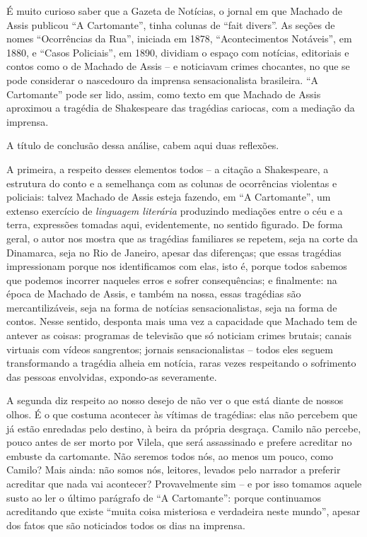 \documentclass{extarticle}
\begin{document}
É muito curioso saber que a Gazeta de Notícias, o jornal em que Machado
de Assis publicou ``A Cartomante'', tinha colunas de ``fait divers''. As
seções de nomes ``Ocorrências da Rua'', iniciada em 1878,
``Acontecimentos Notáveis'', em 1880, e ``Casos Policiais'', em 1890,
dividiam o espaço com notícias, editoriais e contos como o de Machado de
Assis -- e noticiavam crimes chocantes, no que se pode considerar o
nascedouro da imprensa sensacionalista brasileira. ``A Cartomante'' pode
ser lido, assim, como texto em que Machado de Assis aproximou a tragédia
de Shakespeare das tragédias cariocas, com a mediação da imprensa.

A título de conclusão dessa análise, cabem aqui duas reflexões.

A primeira, a respeito desses elementos todos -- a citação a
Shakespeare, a estrutura do conto e a semelhança com as colunas de
ocorrências violentas e policiais: talvez Machado de Assis esteja
fazendo, em ``A Cartomante'', um extenso exercício de \emph{linguagem
literária} produzindo mediações entre o céu e a terra, expressões
tomadas aqui, evidentemente, no sentido figurado. De forma geral, o
autor nos mostra que as tragédias familiares se repetem, seja na corte
da Dinamarca, seja no Rio de Janeiro, apesar das diferenças; que essas
tragédias impressionam porque nos identificamos com elas, isto é, porque
todos sabemos que podemos incorrer naqueles erros e sofrer
consequências; e finalmente: na época de Machado de Assis, e também na
nossa, essas tragédias são mercantilizáveis, seja na forma de notícias
sensacionalistas, seja na forma de contos. Nesse sentido, desponta mais
uma vez a capacidade que Machado tem de antever as coisas: programas de
televisão que só noticiam crimes brutais; canais virtuais com vídeos
sangrentos; jornais sensacionalistas -- todos eles seguem transformando
a tragédia alheia em notícia, raras vezes respeitando o sofrimento das
pessoas envolvidas, expondo-as severamente.

A segunda diz respeito ao nosso desejo de não ver o que está diante de
nossos olhos. É o que costuma acontecer às vítimas de tragédias: elas
não percebem que já estão enredadas pelo destino, à beira da própria
desgraça. Camilo não percebe, pouco antes de ser morto por Vilela, que
será assassinado e prefere acreditar no embuste da cartomante. Não
seremos todos nós, ao menos um pouco, como Camilo? Mais ainda: não somos
nós, leitores, levados pelo narrador a preferir acreditar que nada vai
acontecer? Provavelmente sim -- e por isso tomamos aquele susto ao ler o
último parágrafo de ``A Cartomante'': porque continuamos acreditando que
existe ``muita coisa misteriosa e verdadeira neste mundo'', apesar dos
fatos que são noticiados todos os dias na imprensa.
\end{document}
